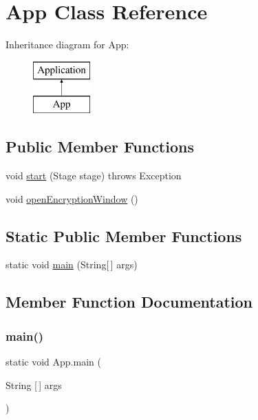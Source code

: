 \hypertarget{class_app}{}\section{App Class Reference}
\label{class_app}
Inheritance diagram for App\+:\begin{figure}[H]
\begin{center}
\leavevmode
\includegraphics[height=2.000000cm]{class_app}
\end{center}
\end{figure}
\subsection*{Public Member Functions}
\begin{DoxyCompactItemize}
\item 
void \mbox{\hyperlink{class_app_a1e9bed8a34c642bf9796dc6ba51ad2b6}{start}} (Stage stage)  throws Exception 
\item 
void \mbox{\hyperlink{class_app_ac05e2e5c6881f45164dba0662e9741ee}{open\+Encryption\+Window}} ()
\end{DoxyCompactItemize}
\subsection*{Static Public Member Functions}
\begin{DoxyCompactItemize}
\item 
static void \mbox{\hyperlink{class_app_a941972c4be68395f473d23f1cbf101a7}{main}} (String\mbox{[}$\,$\mbox{]} args)
\end{DoxyCompactItemize}


\subsection{Member Function Documentation}
\mbox{\label{class_app_a941972c4be68395f473d23f1cbf101a7}} 
\subsubsection{\texorpdfstring{main()}{main()}}
{\footnotesize\ttfamily static void App.\+main (\begin{DoxyParamCaption}\item[{String \mbox{[}$\,$\mbox{]}}]{args }\end{DoxyParamCaption})\hspace{0.3cm}{\ttfamily [static]}}

